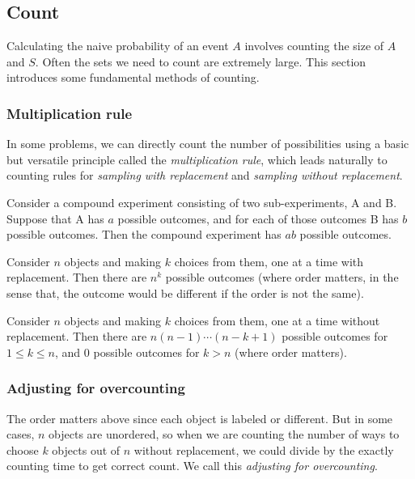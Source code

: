 \subsection{Count}

Calculating the naive probability of an event $A$ involves counting the size of $A$ and $S$. Often the sets we need to count are extremely large. This section introduces some fundamental methods of counting.

\subsubsection{Multiplication rule}

In some problems, we can directly count the number of possibilities using a basic but versatile principle called the \textit{multiplication rule}, which leads naturally to counting rules for \textit{sampling with replacement} and \textit{sampling without replacement}.

\begin{thm}
    Consider a compound experiment consisting of two sub-experiments, A and B. Suppose that A has $a$ possible outcomes, and for each of those outcomes B has $b$ possible outcomes. Then the compound experiment has $ab$ possible outcomes.
\end{thm}

\begin{thm}
    Consider $n$ objects and making $k$ choices from them, one at a time with replacement. Then there are $n^k$ possible outcomes (where order matters, in the sense that, the outcome would be different if the order is not the same).
\end{thm}

\begin{thm}
    Consider $n$ objects and making $k$ choices from them, one at a time without replacement. Then there are $n(n-1)\cdots(n-k+1)$ possible outcomes for $1\leq k \leq n$, and $0$ possible outcomes for $k>n$ (where order matters).
\end{thm}

\subsubsection{Adjusting for overcounting}

The order matters above since each object is labeled or different. But in some cases, $n$ objects are unordered, so when we are counting the number of ways to choose $k$ objects out of $n$ without replacement, we could divide by the exactly counting time to get correct count. We call this \textit{adjusting for overcounting}. 

